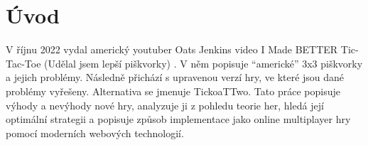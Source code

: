 \makeatletter
\renewcommand{\@chapapp}{}%
\newenvironment{chapquote}[2][2em]
  {\setlength{\@tempdima}{#1}%
   \def\chapquote@author{#2}%
   \parshape 1 \@tempdima \dimexpr\textwidth-2\@tempdima\relax%
   \itshape}
  {\par\normalfont\hfill--\ \chapquote@author\hspace*{\@tempdima}\par\bigskip}
\makeatother

\chapter*{Úvod}

V říjnu 2022 vydal americký youtuber Oats Jenkins video I Made BETTER
Tic-Tac-Toe (Udělal jsem lepší piškvorky) \cite{jenkins22}. V něm popisuje
\enquote{americké} 3x3 piškvorky a jejich problémy. Následně přichází s
upravenou verzí hry, ve které jsou dané problémy vyřešeny. Alternativa se
jmenuje TickoaTTwo. Tato práce popisuje výhody a nevýhody nové hry, analyzuje
ji z pohledu teorie her, hledá její optimální strategii a popisuje způsob
implementace jako online multiplayer hry pomocí moderních webových technologií.
